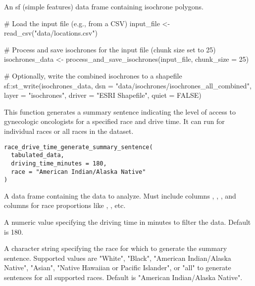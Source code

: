 \documentclass[a4paper]{book}
\begin{document}
%
\begin{Value}
An sf (simple features) data frame containing isochrone polygons.
\end{Value}
%
\begin{Examples}
\begin{ExampleCode}
# Load the input file (e.g., from a CSV)
input_file <- read_csv("data/locations.csv")

# Process and save isochrones for the input file (chunk size set to 25)
isochrones_data <- process_and_save_isochrones(input_file, chunk_size = 25)

# Optionally, write the combined isochrones to a shapefile
sf::st_write(isochrones_data, dsn = "data/isochrones/isochrones_all_combined",
             layer = "isochrones", driver = "ESRI Shapefile", quiet = FALSE)

\end{ExampleCode}
\end{Examples}
%
\begin{Description}
This function generates a summary sentence indicating the level of access to gynecologic oncologists for a specified race and drive time.
It can run for individual races or all races in the dataset.
\end{Description}
%
\begin{Usage}
\begin{verbatim}
race_drive_time_generate_summary_sentence(
  tabulated_data,
  driving_time_minutes = 180,
  race = "American Indian/Alaska Native"
)
\end{verbatim}
\end{Usage}
%
\begin{Arguments}
\begin{ldescription}
\item[\code{tabulated\_data}] A data frame containing the data to analyze. Must include columns , , , and columns for race proportions like , , etc.

\item[\code{driving\_time\_minutes}] A numeric value specifying the driving time in minutes to filter the data. Default is 180.

\item[\code{race}] A character string specifying the race for which to generate the summary sentence. Supported values are "White", "Black", "American Indian/Alaska Native", "Asian", "Native Hawaiian or Pacific Islander", or "all" to generate sentences for all supported races. Default is "American Indian/Alaska Native".
\end{ldescription}
\end{Arguments}
\end{document}

